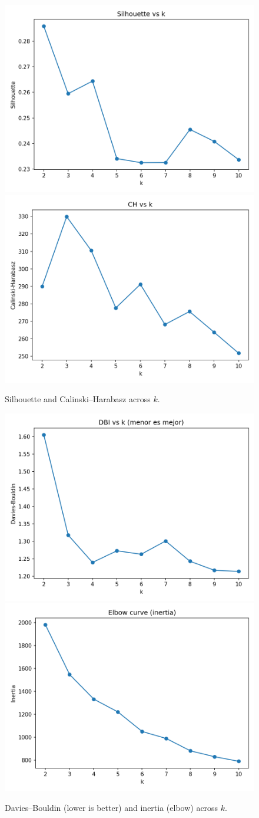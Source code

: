 \documentclass[journal]{IEEEtran}
\begin{document}
\begin{figure}[H]
	\centering
	\includegraphics[width=.48\linewidth]{assets/silhouette_vs_k.png}\hfill
	\includegraphics[width=.48\linewidth]{assets/ch_vs_k.png}
	\caption{Silhouette and Calinski--Harabasz across $k$.}
	\label{fig:silhouette-kmeans}\label{fig:ch-kmeans}
\end{figure}

\begin{figure}[H]
	\centering
	\includegraphics[width=.48\linewidth]{assets/dbi_vs_k.png}\hfill
	\includegraphics[width=.48\linewidth]{assets/elbow_inertia.png}
	\caption{Davies--Bouldin (lower is better) and inertia (elbow) across $k$.}
	\label{fig:dbi-kmeans}\label{fig:elbow-kmeans}
\end{figure}
\end{document}
